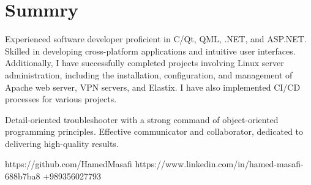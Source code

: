 \section{Summry}

Experienced software developer proficient in C/Qt, QML, .NET, and ASP.NET. Skilled in developing cross-platform applications and intuitive user interfaces. Additionally, I have successfully completed projects involving Linux server administration, including the installation, configuration, and management of Apache web server, VPN servers, and Elastix. I have also implemented CI/CD processes for various projects.


Detail-oriented troubleshooter with a strong command of object-oriented programming principles. Effective communicator and collaborator, dedicated to delivering high-quality results.


\faGithub https://github.com/HamedMasafi
\faLinkedin https://www.linkedin.com/in/hamed-masafi-688b7ba8
\faPhone +989356027793
